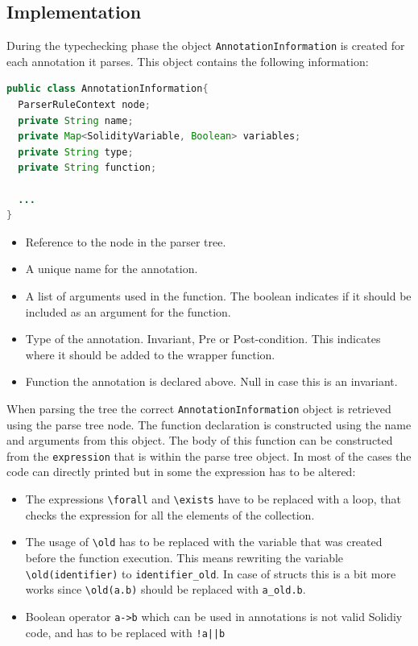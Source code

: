 \documentclass[a4paper]{article}
\begin{document}
\subsection{Implementation}
During the typechecking phase the object \texttt{AnnotationInformation} is created for each annotation it parses. This object contains the following information:
\begin{lstlisting}[breaklines=true, language=Java ]
public class AnnotationInformation{  
  ParserRuleContext node;
  private String name;
  private Map<SolidityVariable, Boolean> variables;
  private String type;
  private String function;

  ...
}
\end{lstlisting}
\begin{itemize}
  \item Reference to the node in the parser tree.
  \item A unique name for the annotation.
  \item A list of arguments used in the function. The boolean indicates if it should be included as an argument for the function.
  \item Type of the annotation. Invariant, Pre or Post-condition. This indicates where it should be added to the wrapper function.
  \item Function the annotation is declared above. Null in case this is an invariant.
\end{itemize}
When parsing the tree the correct \texttt{AnnotationInformation} object is retrieved using the parse tree node. The function declaration is constructed using the name and arguments from this object. The body of this function can be constructed from the \texttt{expression} that is within the parse tree object. In most of the cases the code can directly printed but in some the expression has to be altered:
\begin{itemize}
  \item The expressions \texttt{\textbackslash forall} and \texttt{\textbackslash exists} have to be replaced with a loop, that checks the expression for all the elements of the collection. 
  \item The usage of \texttt{\textbackslash old} has to be replaced with the variable that was created before the function execution. This means rewriting the variable \texttt{\textbackslash old(identifier)} to \texttt{identifier\_old}. In case of structs this is a bit more works since \texttt{\textbackslash old(a.b)} should be replaced with \texttt{a\_old.b}.
  \item Boolean operator \texttt{a->b} which can be used in annotations is not valid Solidiy code, and has to be replaced with \texttt{!a||b}
\end{itemize}
\end{document}
